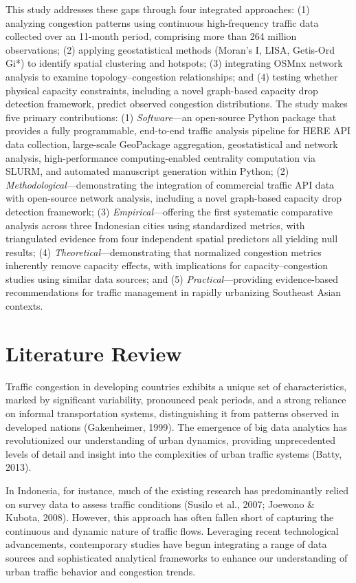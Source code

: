 \documentclass[12pt,a4paper]{article}
\begin{document}
This study addresses these gaps through four integrated approaches: (1) analyzing congestion patterns using continuous high-frequency traffic data collected over an 11-month period, comprising more than 264 million observations; (2) applying geostatistical methods (Moran's I, LISA, Getis-Ord Gi*) to identify spatial clustering and hotspots; (3) integrating OSMnx network analysis to examine topology--congestion relationships; and (4) testing whether physical capacity constraints, including a novel graph-based capacity drop detection framework, predict observed congestion distributions. The study makes five primary contributions: (1) \emph{Software}---an open-source Python package that provides a fully programmable, end-to-end traffic analysis pipeline for HERE API data collection, large-scale GeoPackage aggregation, geostatistical and network analysis, high-performance computing-enabled centrality computation via SLURM, and automated manuscript generation within Python; (2) \emph{Methodological}---demonstrating the integration of commercial traffic API data with open-source network analysis, including a novel graph-based capacity drop detection framework; (3) \emph{Empirical}---offering the first systematic comparative analysis across three Indonesian cities using standardized metrics, with triangulated evidence from four independent spatial predictors all yielding null results; (4) \emph{Theoretical}---demonstrating that normalized congestion metrics inherently remove capacity effects, with implications for capacity--congestion studies using similar data sources; and (5) \emph{Practical}---providing evidence-based recommendations for traffic management in rapidly urbanizing Southeast Asian contexts.



\section{Literature Review}

Traffic congestion in developing countries exhibits a unique set of characteristics, marked by significant variability, pronounced peak periods, and a strong reliance on informal transportation systems, distinguishing it from patterns observed in developed nations (Gakenheimer, 1999). The emergence of big data analytics has revolutionized our understanding of urban dynamics, providing unprecedented levels of detail and insight into the complexities of urban traffic systems (Batty, 2013).

In Indonesia, for instance, much of the existing research has predominantly relied on survey data to assess traffic conditions (Susilo et al., 2007; Joewono \& Kubota, 2008). However, this approach has often fallen short of capturing the continuous and dynamic nature of traffic flows. Leveraging recent technological advancements, contemporary studies have begun integrating a range of data sources and sophisticated analytical frameworks to enhance our understanding of urban traffic behavior and congestion trends.
\end{document}
